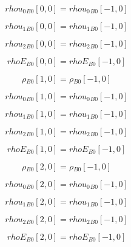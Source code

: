 \documentclass{article}
\begin{document}
\begin{dmath}{rhou_{0}{_{B0}}}[{0,0}] = {rhou_{0}{_{B0}}}[{-1,0}]\end{dmath}

\begin{dmath}{rhou_{1}{_{B0}}}[{0,0}] = {rhou_{1}{_{B0}}}[{-1,0}]\end{dmath}

\begin{dmath}{rhou_{2}{_{B0}}}[{0,0}] = {rhou_{2}{_{B0}}}[{-1,0}]\end{dmath}

\begin{dmath}{rhoE{_{B0}}}[{0,0}] = {rhoE{_{B0}}}[{-1,0}]\end{dmath}

\begin{dmath}{\rho{_{B0}}}[{1,0}] = {\rho{_{B0}}}[{-1,0}]\end{dmath}

\begin{dmath}{rhou_{0}{_{B0}}}[{1,0}] = {rhou_{0}{_{B0}}}[{-1,0}]\end{dmath}

\begin{dmath}{rhou_{1}{_{B0}}}[{1,0}] = {rhou_{1}{_{B0}}}[{-1,0}]\end{dmath}

\begin{dmath}{rhou_{2}{_{B0}}}[{1,0}] = {rhou_{2}{_{B0}}}[{-1,0}]\end{dmath}

\begin{dmath}{rhoE{_{B0}}}[{1,0}] = {rhoE{_{B0}}}[{-1,0}]\end{dmath}

\begin{dmath}{\rho{_{B0}}}[{2,0}] = {\rho{_{B0}}}[{-1,0}]\end{dmath}

\begin{dmath}{rhou_{0}{_{B0}}}[{2,0}] = {rhou_{0}{_{B0}}}[{-1,0}]\end{dmath}

\begin{dmath}{rhou_{1}{_{B0}}}[{2,0}] = {rhou_{1}{_{B0}}}[{-1,0}]\end{dmath}

\begin{dmath}{rhou_{2}{_{B0}}}[{2,0}] = {rhou_{2}{_{B0}}}[{-1,0}]\end{dmath}

\begin{dmath}{rhoE{_{B0}}}[{2,0}] = {rhoE{_{B0}}}[{-1,0}]\end{dmath}
\end{document}
